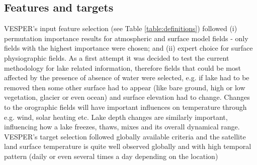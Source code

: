 \documentclass[hess, twostagejnl]{copernicus}
\begin{document}
\subsection{Features and targets}
VESPER's input feature selection (see Table \ref{table:definitions}) followed (i) permutation importance results for atmospheric and surface model fields - only fields with the highest importance were chosen; and (ii) expert choice for surface physiographic fields. As a first attempt it was decided to test the current methodology for lake related information, therefore fields that could be most affected by the presence of absence of water were selected, e.g. if lake had to be removed then some other surface had to appear (like bare ground, high or low vegetation, glacier or even ocean) and surface elevation had to change. Changes to the orographic fields will have important influences on temperature through e.g. wind, solar heating etc. Lake depth changes are similarly important, influencing how a lake freezes, thaws, mixes and its overall dynamical range. VESPER's target selection followed globally available criteria and the satellite land surface temperature is quite well observed globally and with high temporal pattern (daily or even several times a day depending on the location)
\end{document}
